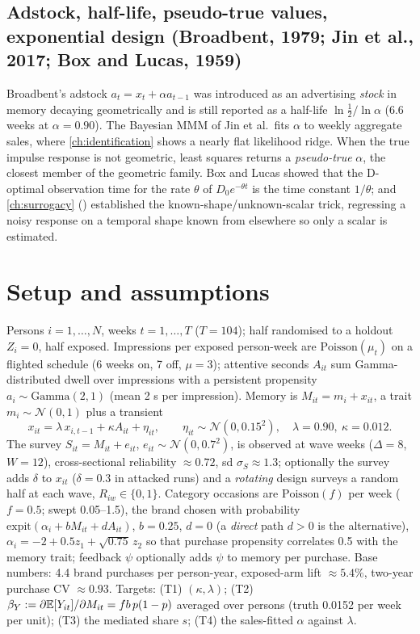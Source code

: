 \subsection{Adstock, half-life, pseudo-true values, exponential design (Broadbent, 1979; Jin et al., 2017; Box and Lucas, 1959)}

Broadbent's adstock $a_t = x_t + \alpha a_{t-1}$ was introduced as an advertising \emph{stock} in memory decaying geometrically and is still reported as a half-life $\ln\tfrac12/\ln\alpha$ (6.6 weeks at $\alpha = 0.90$). The Bayesian MMM of Jin et al.\ fits $\alpha$ to weekly aggregate sales, where \cref{ch:identification} shows a nearly flat likelihood ridge. When the true impulse response is not geometric, least squares returns a \emph{pseudo-true} $\alpha$, the closest member of the geometric family. Box and Lucas showed that the D-optimal observation time for the rate $\theta$ of $D_0 e^{-\theta t}$ is the time constant $1/\theta$; and \cref{ch:surrogacy} () established the known-shape/unknown-scalar trick, regressing a noisy response on a temporal shape known from elsewhere so only a scalar is estimated.

\section{Setup and assumptions}

Persons $i = 1, \ldots, N$, weeks $t = 1, \ldots, T$ ($T = 104$); half randomised to a holdout $Z_i = 0$, half exposed. Impressions per exposed person-week are $\mathrm{Poisson}(\mu_t)$ on a flighted schedule (6 weeks on, 7 off, $\mu = 3$); attentive seconds $A_{it}$ sum Gamma-distributed dwell over impressions with a persistent propensity $a_i \sim \mathrm{Gamma}(2, 1)$ (mean 2 s per impression). Memory is $M_{it} = m_i + x_{it}$, a trait $m_i \sim \mathcal N(0, 1)$ plus a transient
\begin{equation}
x_{it} = \lambda\, x_{i,t-1} + \kappa A_{it} + \eta_{it}, \qquad \eta_{it} \sim \mathcal N(0, 0.15^2),\quad \lambda = 0.90,\ \kappa = 0.012.
\label{panel:eq:memory}
\end{equation}
The survey $S_{it} = M_{it} + e_{it}$, $e_{it} \sim \mathcal N(0, 0.7^2)$, is observed at wave weeks ($\Delta = 8$, $W = 12$), cross-sectional reliability $\approx 0.72$, sd $\sigma_S \approx 1.3$; optionally the survey adds $\delta$ to $x_{it}$ ($\delta = 0.3$ in attacked runs) and a \emph{rotating} design surveys a random half at each wave, $R_{iw} \in \{0, 1\}$. Category occasions are $\mathrm{Poisson}(f)$ per week ($f = 0.5$; swept 0.05--1.5), the brand chosen with probability $\mathrm{expit}(\alpha_i + b M_{it} + d A_{it})$, $b = 0.25$, $d = 0$ (a \emph{direct} path $d > 0$ is the alternative), $\alpha_i = -2 + 0.5 z_{1} + \sqrt{0.75}\, z_{2}$ so that purchase propensity correlates 0.5 with the memory trait; feedback $\psi$ optionally adds $\psi$ to memory per purchase. Base numbers: 4.4 brand purchases per person-year, exposed-arm lift $\approx 5.4\%$, two-year purchase CV $\approx 0.93$. Targets: (T1) $(\kappa, \lambda)$; (T2) $\beta_Y := \partial \mathbb{E}[Y_{it}]/\partial M_{it} = f b\,p(1-p)$ averaged over persons (truth 0.0152 per week per unit); (T3) the mediated share $s$; (T4) the sales-fitted $\alpha$ against $\lambda$.

